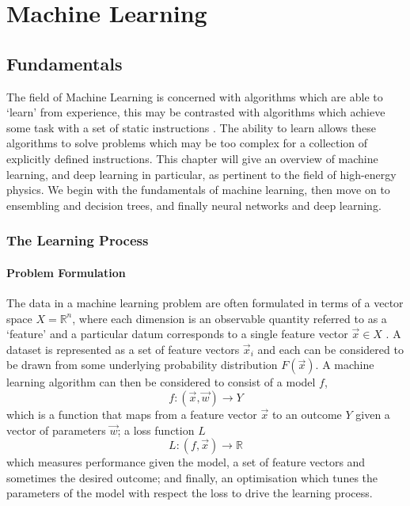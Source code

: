 \chapter{Machine Learning}
\label{chap:machine_learning}


\newpage

\section{Fundamentals}
The field of Machine Learning is concerned with algorithms which are able to `learn' from experience, this may be contrasted with algorithms which achieve some task with a set of static instructions \cite{DeepLearningBook}. The ability to learn allows these algorithms to solve problems which may be too complex for a collection of explicitly defined instructions. 
This chapter will give an overview of machine learning, and deep learning in particular, as pertinent to the field of high-energy physics. We begin with the fundamentals of machine learning, then move on to ensembling and decision trees, and finally neural networks and deep learning.  


\subsection{The Learning Process}

\subsubsection{Problem Formulation}
The data in a machine learning problem are often formulated in terms of a vector space $X = \mathds{R}^{n}$, where each dimension is an observable quantity referred to as a `feature' and a particular datum corresponds to a single feature vector $\vec{x} \in X$ \cite{elementsOfStatsLearning}. A dataset is represented as a set of feature vectors $\vec{x}_{i}$ and each can be considered to be drawn from some underlying probability distribution $F(\vec{x})$.
A machine learning algorithm can then be considered \cite{elementsOfStatsLearning} to consist of a model $f$, 
\begin{equation}
    f:(\vec{x},\vec{w})\rightarrow{Y}
\end{equation}
which is a function that maps from a feature vector $\vec{x}$ to an outcome $Y$ given a vector of parameters $\vec{w}$; a loss function $L$
\begin{equation}
    L:(f,\vec{x})\rightarrow{\mathds{R}}
\end{equation}
which measures performance given the model, a set of feature vectors and sometimes the desired outcome; 
and finally, an optimisation which tunes the parameters of the model with respect the loss to drive the learning process.


